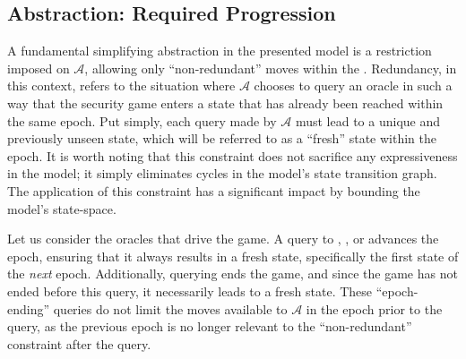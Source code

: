 \documentclass[runningheads]{llncs}
\newcommand{\Adversary}{\ensuremath{\mathcal{A}}\xspace}
\begin{document}

\subsection{Abstraction: Required Progression\label{sec:abstraction-progression}}

A fundamental simplifying abstraction in the presented model is a restriction imposed on \Adversary, allowing only ``non-redundant'' moves within the \CGKAsec.
Redundancy, in this context, refers to the situation where \Adversary chooses to query an oracle in such a way that the security game enters a state that has already been reached within the same epoch.
Put simply, each query made by \Adversary must lead to a unique and previously unseen state, which will be referred to as a ``fresh'' state within the epoch.
It is worth noting that this constraint does not sacrifice any expressiveness in the model; it simply eliminates cycles in the model's state transition graph.
The application of this constraint has a significant impact by bounding the model's state-space.

Let us consider the oracles that drive the game. A query to , , or  advances the epoch, ensuring that it always results in a fresh state, specifically the first state of the \emph{next} epoch.
Additionally, querying  ends the game, and since the game has not ended before this query, it necessarily leads to a fresh state.
These ``epoch-ending'' queries do not limit the moves available to \Adversary in the epoch prior to the query, as the previous epoch is no longer relevant to the ``non-redundant'' constraint after the query.
\end{document}
